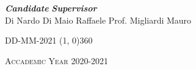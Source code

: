\begin{titlepage}
\vfill
\begin{normalsize}
\begin{flushleft}
  \hspace{62pt} \textbf{\textit{Candidate}} \hspace{130pt} \textbf{\textit{Supervisor}}\\
  \vspace{5pt}
  \hspace{27pt} {Di Nardo Di Maio Raffaele} \hspace{65pt} {Prof. Migliardi Mauro}\\
\end{flushleft}
\end{normalsize}

\vfill
\begin{center}
\textsc{DD-MM-2021}
\hspace{-0.2cm}
\line(1, 0){360}

\textsc{Accademic Year 2020-2021}
\end{center}
\end{titlepage}
\cleardoublepage %
\thispagestyle{empty}